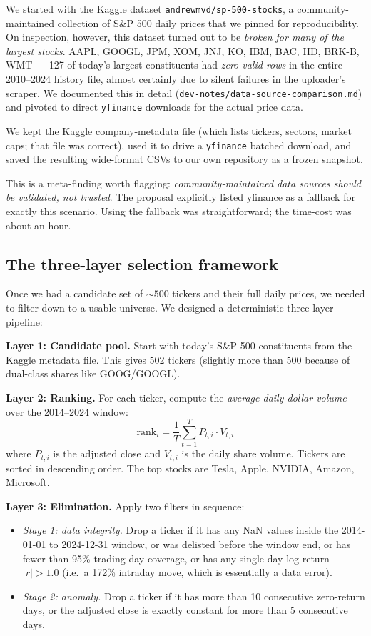 \documentclass[11pt]{article}
\begin{document}
We started with the Kaggle dataset \texttt{andrewmvd/sp-500-stocks}, a community-maintained collection of S\&P 500 daily prices that we pinned for reproducibility. On inspection, however, this dataset turned out to be \emph{broken for many of the largest stocks}. AAPL, GOOGL, JPM, XOM, JNJ, KO, IBM, BAC, HD, BRK-B, WMT --- 127 of today's largest constituents had \emph{zero valid rows} in the entire 2010--2024 history file, almost certainly due to silent failures in the uploader's scraper. We documented this in detail (\texttt{dev-notes/data-source-comparison.md}) and pivoted to direct \texttt{yfinance} downloads for the actual price data.

We kept the Kaggle company-metadata file (which lists tickers, sectors, market caps; that file was correct), used it to drive a \texttt{yfinance} batched download, and saved the resulting wide-format CSVs to our own repository as a frozen snapshot.

This is a meta-finding worth flagging: \emph{community-maintained data sources should be validated, not trusted}. The proposal explicitly listed yfinance as a fallback for exactly this scenario. Using the fallback was straightforward; the time-cost was about an hour.

\subsection{The three-layer selection framework}

Once we had a candidate set of $\sim 500$ tickers and their full daily prices, we needed to filter down to a usable universe. We designed a deterministic three-layer pipeline:

\textbf{Layer 1: Candidate pool.} Start with today's S\&P 500 constituents from the Kaggle metadata file. This gives 502 tickers (slightly more than 500 because of dual-class shares like GOOG/GOOGL).

\textbf{Layer 2: Ranking.} For each ticker, compute the \emph{average daily dollar volume} over the 2014--2024 window:
\[
\mathrm{rank}_i = \frac{1}{T} \sum_{t=1}^{T} P_{t,i} \cdot V_{t,i}
\]
where $P_{t,i}$ is the adjusted close and $V_{t,i}$ is the daily share volume. Tickers are sorted in descending order. The top stocks are Tesla, Apple, NVIDIA, Amazon, Microsoft.

\textbf{Layer 3: Elimination.} Apply two filters in sequence:
\begin{itemize}
    \item \emph{Stage 1: data integrity.} Drop a ticker if it has any NaN values inside the 2014-01-01 to 2024-12-31 window, or was delisted before the window end, or has fewer than 95\% trading-day coverage, or has any single-day log return $|r| > 1.0$ (i.e.~a 172\% intraday move, which is essentially a data error).
    \item \emph{Stage 2: anomaly.} Drop a ticker if it has more than 10 consecutive zero-return days, or the adjusted close is exactly constant for more than 5 consecutive days.
\end{itemize}
\end{document}
